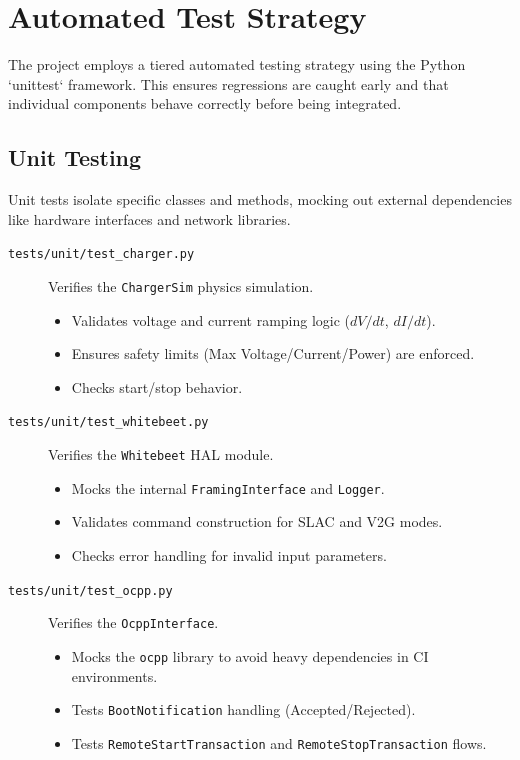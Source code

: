 \documentclass[a4paper,11pt]{report}
\begin{document}
\section{Automated Test Strategy}
The project employs a tiered automated testing strategy using the Python `unittest` framework. This ensures regressions are caught early and that individual components behave correctly before being integrated.

\subsection{Unit Testing}
Unit tests isolate specific classes and methods, mocking out external dependencies like hardware interfaces and network libraries.
\begin{description}
    \item[\texttt{tests/unit/test\_charger.py}] Verifies the \texttt{ChargerSim} physics simulation.
    \begin{itemize}
        \item Validates voltage and current ramping logic ($dV/dt$, $dI/dt$).
        \item Ensures safety limits (Max Voltage/Current/Power) are enforced.
        \item Checks start/stop behavior.
    \end{itemize}
    \item[\texttt{tests/unit/test\_whitebeet.py}] Verifies the \texttt{Whitebeet} HAL module.
    \begin{itemize}
        \item Mocks the internal \texttt{FramingInterface} and \texttt{Logger}.
        \item Validates command construction for SLAC and V2G modes.
        \item Checks error handling for invalid input parameters.
    \end{itemize}
    \item[\texttt{tests/unit/test\_ocpp.py}] Verifies the \texttt{OcppInterface}.
    \begin{itemize}
        \item Mocks the \texttt{ocpp} library to avoid heavy dependencies in CI environments.
        \item Tests \texttt{BootNotification} handling (Accepted/Rejected).
        \item Tests \texttt{RemoteStartTransaction} and \texttt{RemoteStopTransaction} flows.
    \end{itemize}
\end{description}
\end{document}
